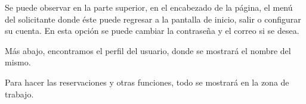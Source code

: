 Se puede observar en la parte superior, en el encabezado de la página,
el menú del solicitante donde éste puede regresar a la pantalla de inicio,
salir o configurar su cuenta. En esta opción se puede cambiar la contraseña
y el correo si se desea.

Más abajo, encontramos el perfil del usuario, donde se mostrará el nombre
del mismo. 

Para hacer las reservaciones y otras funciones, todo se mostrará en la zona
de trabajo.
